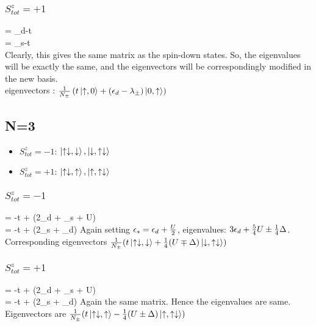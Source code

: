\documentclass[12pt]{article}
\begin{document}
\subsubsection{\(S_{tot}^z = +1\)}
\beq
\ham{} = \epsilon_d-t \\
\ham{} = \epsilon_s-t \\
\eeq
Clearly, this gives the same matrix as the spin-down states. So, the eigenvalues will be exactly the same, and the eigenvectors will be correspondingly modified in the new basis. \\
eigenvectors : \(\frac{1}{N_\pm}\left({t\ket{\uparrow,0}+(\epsilon_d-\lambda_\pm)\ket{0,\uparrow}}\right)\)
\subsection{N=3}
\begin{itemize}
\item \(S_{tot}^z = -1\): \(\ket{\uparrow\downarrow,\downarrow}, \ket{\downarrow,\uparrow\downarrow}\)
\item \(S_{tot}^z = +1\): \(\ket{\uparrow\downarrow,\uparrow}, \ket{\uparrow,\uparrow\downarrow}\)
\end{itemize}
\subsubsection{\(S_{tot}^z = -1\)}
\beq
\ham \ket{\uparrow\downarrow,\downarrow} = -t\ket{\downarrow,\uparrow\downarrow} + (2\epsilon_d + \epsilon_s + U)\ket{\uparrow\downarrow,\downarrow} \\
\ham \ket{\downarrow,\uparrow\downarrow} = -t\ket{\uparrow\downarrow,\downarrow} + (2\epsilon_s + \epsilon_d)\ket{\downarrow,\uparrow\downarrow}
\eeq
\beq
{}
\eeq
Again setting \(\epsilon_s = \epsilon_d + \frac{U}{2}\), eigenvalues: \(3\epsilon_d + \frac{5}{4}U \pm \frac{1}{4}\Delta\). \\ Corresponding eigenvectors \(\frac{1}{N_\pm}(t\ket{\uparrow\downarrow,\downarrow}+\frac{1}{4}(U\mp\Delta)\ket{\downarrow,\uparrow\downarrow})\)

\subsubsection{\(S_{tot}^z = +1\)}
\beq
\ham \ket{\uparrow\downarrow,\uparrow} = -t\ket{\uparrow,\uparrow\downarrow} + (2\epsilon_d + \epsilon_s + U)\ket{\uparrow\downarrow,\uparrow} \\
\ham \ket{\uparrow,\uparrow\downarrow} = -t\ket{\uparrow\downarrow,\uparrow} + (2\epsilon_s + \epsilon_d)\ket{\uparrow,\uparrow\downarrow}
\eeq
Again the same matrix. Hence the eigenvalues are same. Eigenvectors are
\(\frac{1}{N_\pm}(t\ket{\uparrow\downarrow,\uparrow}-\frac{1}{4}(U\pm\Delta)\ket{\uparrow,\uparrow\downarrow})\)
\end{document}
